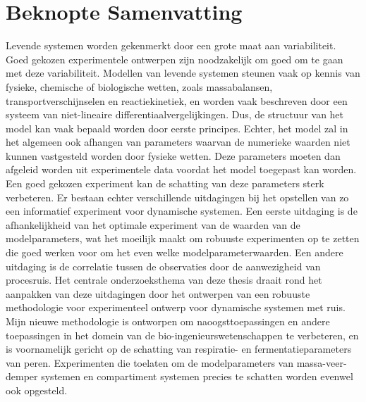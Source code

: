 \chapter*{Beknopte Samenvatting}
Levende systemen worden gekenmerkt door een grote maat aan variabiliteit. Goed gekozen experimentele ontwerpen zijn noodzakelijk om goed om te gaan met deze variabiliteit. Modellen van levende systemen steunen vaak op kennis van fysieke, chemische of biologische wetten, zoals massabalansen, transportverschijnselen en reactiekinetiek, en worden vaak beschreven door een systeem van niet-lineaire differentiaalvergelijkingen. Dus, de structuur van het model kan vaak bepaald worden door eerste principes. Echter, het model zal in het algemeen ook afhangen van parameters waarvan de numerieke waarden niet kunnen vastgesteld worden door fysieke wetten. Deze parameters moeten dan afgeleid worden uit experimentele data voordat het model toegepast kan worden. Een goed gekozen experiment kan de schatting van deze parameters sterk verbeteren. Er bestaan echter verschillende uitdagingen bij het opstellen van zo een informatief experiment voor dynamische systemen. Een eerste uitdaging is de afhankelijkheid van het optimale experiment van de waarden van de modelparameters, wat het moeilijk maakt om robuuste experimenten op te zetten die goed werken voor om het even welke modelparameterwaarden. Een andere uitdaging is de correlatie tussen de observaties door de aanwezigheid van procesruis. Het centrale onderzoeksthema van deze thesis draait rond het aanpakken van deze uitdagingen door het ontwerpen van een robuuste methodologie voor experimenteel ontwerp voor dynamische systemen met ruis. Mijn nieuwe methodologie is ontworpen om naoogsttoepassingen {\color{red}en andere toepassingen in het domein van de bio-ingenieurswetenschappen} te verbeteren, en is voornamelijk gericht op de schatting van respiratie- en fermentatieparameters van peren. {\color{red}Experimenten die toelaten om de modelparameters van massa-veer-demper systemen en compartiment systemen precies te schatten worden evenwel ook opgesteld}.
\\
\\
